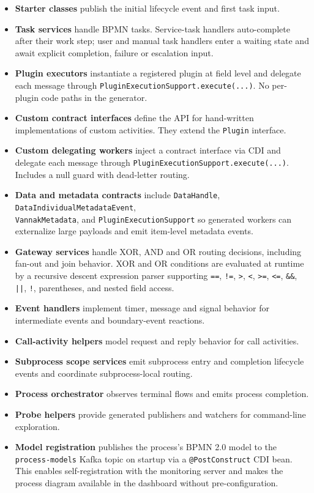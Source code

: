 \begin{itemize}
\item \textbf{Starter classes} publish the initial lifecycle event and first task input.
\item \textbf{Task services} handle BPMN tasks. Service-task handlers auto-complete after
their work step; user and manual task handlers enter a waiting state and await explicit
completion, failure or escalation input.
\item \textbf{Plugin executors} instantiate a registered plugin at field level and delegate
each message through \texttt{PluginExecutionSupport.execute(...)}. No per-plugin
code paths in the generator.
\item \textbf{Custom contract interfaces} define the API for hand-written implementations
of custom activities. They extend the \texttt{Plugin} interface.
\item \textbf{Custom delegating workers} inject a contract interface via CDI and delegate
each message through \texttt{PluginExecutionSupport.execute(...)}. Includes a null
guard with dead-letter routing.
\item \textbf{Data and metadata contracts} include \texttt{DataHandle},
\texttt{DataIndividualMetadataEvent}, \\ \texttt{VannakMetadata}, and
\texttt{PluginExecutionSupport} so generated workers can externalize large payloads
and emit item-level metadata events.
\item \textbf{Gateway services} handle XOR, AND and OR routing decisions, including fan-out
and join behavior. XOR and OR conditions are evaluated at runtime by a recursive descent
expression parser supporting \texttt{==}, \texttt{!=}, \texttt{>}, \texttt{<}, \texttt{>=},
\texttt{<=}, \texttt{\&\&}, \texttt{||}, \texttt{!}, parentheses, and nested field access.
\item \textbf{Event handlers} implement timer, message and signal behavior for intermediate
events and boundary-event reactions.
\item \textbf{Call-activity helpers} model request and reply behavior for call activities.
\item \textbf{Subprocess scope services} emit subprocess entry and completion lifecycle
events and coordinate subprocess-local routing.
\item \textbf{Process orchestrator} observes terminal flows and emits process completion.
\item \textbf{Probe helpers} provide generated publishers and watchers for command-line
exploration.
\item \textbf{Model registration} publishes the process's BPMN 2.0 model to the
\texttt{process-models} Kafka topic on startup via a \texttt{@PostConstruct} CDI bean.
This enables self-registration with the monitoring server and makes the process
diagram available in the dashboard without pre-configuration.
\end{itemize}


